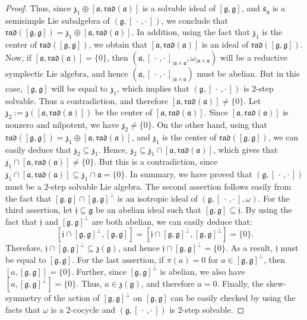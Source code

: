 \documentclass[final,1p,times,nopreprintline]{elsarticle}
\theoremstyle{definition}
\numberwithin{equation}{section}
\newcommand{\w}{\omega}
\newcommand{\g}{\mathfrak{g}}
\newcommand{\ai}{\mathfrak{a}}
\numberwithin{equation}{section}
\newcommand{\z}{\mathfrak{z}}
\newcommand{\cro}{[\,\cdot\,,\cdot\,]}
\newcommand{\jj}{\mathfrak{j}}
\begin{document}
\begin{proof}
	Thus, since $\z_1\oplus[\ai,\mathfrak{rad}(\ai)]$ is a solvable ideal of $[\g,\g]$, and $\mathfrak{s}_\ai$ is a semisimple Lie subalgebra of $(\g,\cro)$, we conclude that $\mathfrak{rad}([\g,\g])=\z_1\oplus[\ai,\mathfrak{rad}(\ai)]$. In addition, using the fact that $\z_1$ is the center of $\mathfrak{rad}([\g,\g])$, we obtain that $[\ai,\mathfrak{rad}(\ai)]$ is an ideal of $\mathfrak{rad}([\g,\g])$. Now, if $[\ai,\mathfrak{rad}(\ai)]=\{0\}$, then $(\ai,\cro_{|\ai\times\ai},\w_{|\ai\times\ai})$ will be a reductive symplectic Lie algebra, and hence $(\ai,\cro_{|\ai\times\ai})$ must be abelian. But in this case, $[\g,\g]$ will be equal to $\z_1$, which implies that $(\g,\cro)$ is $2$-step solvable. Thus a contradiction, and therefore $[\ai,\mathfrak{rad}(\ai)]\neq\{0\}$. Let $\z_2:=\z\left([\ai,\mathfrak{rad}(\ai)]\right)$ be the center of $[\ai,\mathfrak{rad}(\ai)]$. Since $[\ai,\mathfrak{rad}(\ai)]$ is nonzero and nilpotent, we have $\z_2\neq\{0\}$. On the other hand, using that $\mathfrak{rad}([\g,\g])=\z_1\oplus[\ai,\mathfrak{rad}(\ai)]$, and $\z_1$ is the center of $\mathfrak{rad}([\g,\g])$, we can easily deduce that $\z_2\subseteq\z_1$. Hence, $\z_2\subseteq\z_1\cap[\ai,\mathfrak{rad}(\ai)]$, which gives that $\z_1\cap[\ai,\mathfrak{rad}(\ai)]\neq\{0\}$. But this is a contradiction, since $\z_1\cap[\ai,\mathfrak{rad}(\ai)]\subseteq\z_1\cap\ai=\{0\}$. In summary, we have proved that $(\g,\cro)$ must be a $2$-step solvable Lie algebra. The second assertion follows easily from the fact that $[\g,\g]\cap[\g,\g]^\perp$ is an isotropic ideal of $(\g,\cro,\w)$. For the third assertion, let $\jj\subseteq\g$ be an abelian ideal such that $[\g,\g]\subseteq\jj$. By using the fact that $\jj$ and $[\g,\g]^\perp$ are both abelian, we can easily deduce that:
	\begin{equation*}
		\left[\jj\cap [\g,\g]^\perp,[\g,\g]\right]=\left[\jj\cap [\g,\g]^\perp,[\g,\g]^\perp\right]=\{0\}.
	\end{equation*}
	Therefore, $\jj\cap [\g,\g]^\perp\subseteq\z(\g)$, and hence $\jj\cap [\g,\g]^\perp=\{0\}$. As a result, $\jj$ must be equal to $[\g,\g]$. For the last assertion, if $\pi(a)=0$ for $a\in[\g,\g]^\perp$, then $[a,[\g,\g]]=\{0\}$. Further, since $[\g,\g]^\perp$ is abelian, we also have $\left[a,[\g,\g]^\perp\right]=\{0\}$. Thus, $a\in\z(\g)$, and therefore $a=0$. Finally, the skew-symmetry of the action of $[\g,\g]^\perp$ on $[\g,\g]$ can be easily checked by using the facts that $\w$ is a $2$-cocycle and $(\g,\cro)$ is $2$-step solvable.
\end{proof}
\end{document}
